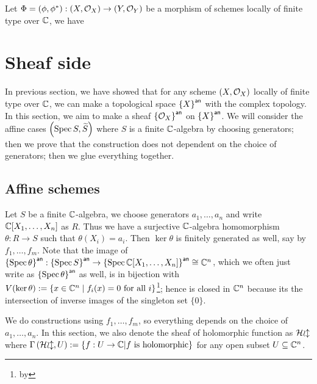 \begin{corollary}
	Let $\Phi = (\phi, \phi^{*}) : \left(X, \mathcal{O}_{X}\right) \to \left(Y, \mathcal{O}_{Y}\right)$ be a morphism of schemes locally of finite type over $\mathbb{C}$, we have
	\begin{center}
	\end{center}
\end{corollary}


\section{Sheaf side}

In previous section, we have showed that for any scheme $\left(X, \mathcal{O}_{X}\right)$ locally of finite type over $\mathbb{C}$, we can make a topological space ${\left\{{X}\right\}}^{\mathsf{an}}$ with the complex topology. In this section, we aim to make a sheaf ${\left\{{\mathcal{O}_{X}}\right\}}^{\mathsf{an}}$ on ${\left\{{X}\right\}}^{\mathsf{an}}$. We will consider the affine cases $\left(\operatorname*{Spec}{S}, \widetilde{S}\right)$ where $S$ is a finite $\mathbb{C}$-algebra by choosing generators; then we prove that the construction does not dependent on the choice of generators; then we glue everything together.

\subsection{Affine schemes}
Let $S$ be a finite $\mathbb{C}$-algebra, we choose generators $a_{1},\dots, a_{n}$ and write $\mathbb{C}[X_{1},\dots,X_{n}]$ as $R$. Thus we have a surjective $\mathbb{C}$-algebra homomorphism $\theta: R \to S$ such that $\theta(X_{i}) = a_{i}$. Then $\ker\theta$ is finitely generated as well, say by $f_{1},\dots,f_{m}$.
Note that the image of ${\left\{{\operatorname{Spec}\theta}\right\}}^{\mathsf{an}}:{\left\{{\operatorname{Spec} S}\right\}}^{\mathsf{an}}\to{\left\{{\ensuremath{\operatorname{Spec}}\ensuremath{\mathbb{C}}[X_{1},\dots, X_{n}]}\right\}}^{\mathsf{an}}\cong \mathbb{C}^{n}$, which we often just write as ${\left\{{\operatorname{Spec}\theta}\right\}}^{\mathsf{an}}$ as well, is in bijection with $V(\ker\theta) := \{x \in \mathbb{C}^{n}\mid f_{i}(x) = 0~\text{for all}~i\}$\footnote{by }; hence is closed in $\mathbb{C}^{n}$ because its the intersection of inverse images of the singleton set $\{0\}$.

We do constructions using $f_{1},\dots, f_{m}$, so everything depends on the choice of $a_{1},\dots,a_{n}$. In this section, we also denote the sheaf of holomorphic function as $\operatorname{\mathcal{Hol}}$ where ${\Gamma\left(\operatorname{\mathcal{Hol}},U\right)} := \{f : U \to \mathbb{C} | f~\text{is holomorphic}\}$ for any open subset $U \subseteq \mathbb{C}^{n}$.

